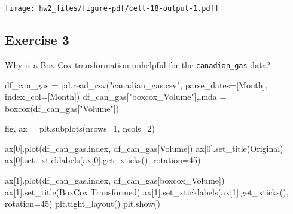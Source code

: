 \documentclass[
  11pt,
]{article}
\newenvironment{Shaded}{\begin{snugshade}}{\end{snugshade}}
\newcommand{\DecValTok}[1]{\textcolor[rgb]{0.68,0.00,0.00}{#1}}
\newcommand{\NormalTok}[1]{\textcolor[rgb]{0.00,0.23,0.31}{#1}}
\newcommand{\OperatorTok}[1]{\textcolor[rgb]{0.37,0.37,0.37}{#1}}
\newcommand{\StringTok}[1]{\textcolor[rgb]{0.13,0.47,0.30}{#1}}
\begin{document}
\texttt{[image: hw2\_files/figure-pdf/cell-18-output-1.pdf]}

\subsection{Exercise 3}\label{exercise-3}

Why is a Box-Cox transformation unhelpful for the \texttt{canadian\_gas}
data?

\begin{Shaded}
\begin{Highlighting}[]
\NormalTok{df\_can\_gas }\OperatorTok{=}\NormalTok{ pd.read\_csv(}\StringTok{"canadian\_gas.csv"}\NormalTok{, parse\_dates}\OperatorTok{=}\NormalTok{[}\StringTok{\textquotesingle{}Month\textquotesingle{}}\NormalTok{], index\_col}\OperatorTok{=}\NormalTok{[}\StringTok{\textquotesingle{}Month\textquotesingle{}}\NormalTok{])}
\NormalTok{df\_can\_gas[}\StringTok{"boxcox\_Volume"}\NormalTok{],lmda }\OperatorTok{=}\NormalTok{ boxcox(df\_can\_gas[}\StringTok{"Volume"}\NormalTok{])}
\end{Highlighting}
\end{Shaded}

\begin{Shaded}
\begin{Highlighting}[]
\NormalTok{fig, ax }\OperatorTok{=}\NormalTok{ plt.subplots(nrows}\OperatorTok{=}\DecValTok{1}\NormalTok{, ncols}\OperatorTok{=}\DecValTok{2}\NormalTok{)}

\NormalTok{ax[}\DecValTok{0}\NormalTok{].plot(df\_can\_gas.index, df\_can\_gas[}\StringTok{\textquotesingle{}Volume\textquotesingle{}}\NormalTok{])}
\NormalTok{ax[}\DecValTok{0}\NormalTok{].set\_title(}\StringTok{\textquotesingle{}Original\textquotesingle{}}\NormalTok{)}
\NormalTok{ax[}\DecValTok{0}\NormalTok{].set\_xticklabels(ax[}\DecValTok{0}\NormalTok{].get\_xticks(), rotation}\OperatorTok{=}\DecValTok{45}\NormalTok{)}

\NormalTok{ax[}\DecValTok{1}\NormalTok{].plot(df\_can\_gas.index, df\_can\_gas[}\StringTok{\textquotesingle{}boxcox\_Volume\textquotesingle{}}\NormalTok{])}
\NormalTok{ax[}\DecValTok{1}\NormalTok{].set\_title(}\StringTok{\textquotesingle{}BoxCox Transformed\textquotesingle{}}\NormalTok{)}
\NormalTok{ax[}\DecValTok{1}\NormalTok{].set\_xticklabels(ax[}\DecValTok{1}\NormalTok{].get\_xticks(), rotation}\OperatorTok{=}\DecValTok{45}\NormalTok{)}
\NormalTok{plt.tight\_layout()}
\NormalTok{plt.show()}
\end{Highlighting}
\end{Shaded}
\end{document}
